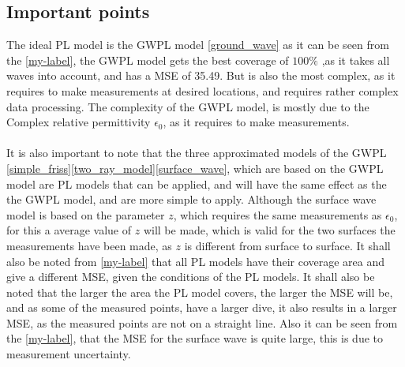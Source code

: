\subsection{Important points}
The ideal PL model is the GWPL model \eqref{ground_wave} as it can be seen from the  \autoref{my-label}, the GWPL model gets the best coverage of $100\%$ ,as it takes all waves into account, and has a MSE of 35.49. But is also the most complex, as it requires to make measurements at desired locations, and requires rather complex data processing. The complexity of the GWPL model, is mostly due to the Complex relative permittivity $\epsilon_{0}$, as it requires to make measurements. 
\\
\\
It is also important to note that the three approximated models of the GWPL \eqref{simple_friss}\eqref{two_ray_model}\eqref{surface_wave}, which are based on the GWPL model are PL models that can be applied, and will have the same effect as the the GWPL model, and are more simple to apply. Although the surface wave model is based on the parameter $z$, which requires the same measurements as $\epsilon_{0}$, for this a average value of $z$ will be made, which is valid for the two surfaces the measurements have been made, as $z$ is different from surface to surface. It shall also be noted from \autoref{my-label} that all PL models have their coverage area and give a different MSE, given the conditions of the PL models. It shall also be noted that the larger the area the PL model covers, the larger the MSE will be, and as some of the measured points, have a larger dive, it also results in a larger MSE, as the measured points are not on a straight line. Also it can be seen from the \autoref{my-label}, that the MSE for the surface wave is quite large, this is due to measurement uncertainty.  



